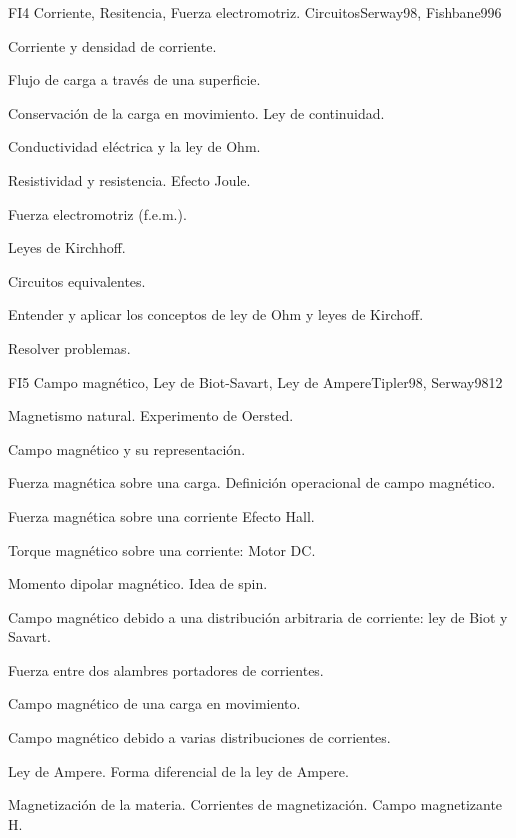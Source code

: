 \begin{syllabus}
\begin{unit}{FI4 Corriente, Resitencia, Fuerza electromotriz. Circuitos}{Serway98, Fishbane99}{6}
   \begin{topics}
         \item  Corriente y densidad de corriente.
	 \item  Flujo de carga a través de una superficie.
         \item  Conservación de la carga en movimiento. Ley de continuidad.
	 \item  Conductividad eléctrica y la ley de Ohm.
         \item  Resistividad y resistencia.  Efecto Joule.
	 \item  Fuerza electromotriz (f.e.m.).
         \item  Leyes de Kirchhoff.
	 \item  Circuitos equivalentes.
   \end{topics}

   \begin{learningoutcomes}
         \item  Entender y aplicar los conceptos de ley de Ohm y leyes de Kirchoff.
         \item  Resolver problemas.
   \end{learningoutcomes}
\end{unit}

\begin{unit}{FI5 Campo magnético, Ley de Biot-Savart, Ley de Ampere}{Tipler98, Serway98}{12}
   \begin{topics}
         \item  Magnetismo natural. Experimento de Oersted.
	 \item  Campo magnético y su representación.
         \item  Fuerza magnética sobre una carga. Definición operacional de campo magnético.
	 \item  Fuerza magnética sobre una corriente  Efecto Hall.
         \item  Torque magnético sobre una corriente: Motor DC.
	 \item  Momento dipolar magnético.  Idea de spin.
         \item  Campo magnético debido a una distribución arbitraria de corriente:  ley de Biot y Savart.
	 \item  Fuerza entre dos alambres portadores de corrientes.
         \item  Campo magnético de una carga en movimiento.
	 \item  Campo magnético debido a varias distribuciones de corrientes.
         \item  Ley de Ampere.  Forma diferencial de la ley de Ampere.
	 \item  Magnetización de la materia. Corrientes de magnetización. Campo magnetizante H.
   \end{topics}


\end{unit}
\end{syllabus}
